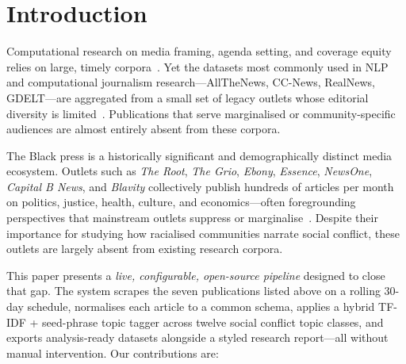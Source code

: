 \documentclass[sigconf,anonymous,review]{acmart}
\begin{document}


\maketitle

\section{Introduction}

Computational research on media framing, agenda setting, and coverage equity
relies on large, timely corpora~\cite{card2015media,hamilton2004news}.
Yet the datasets most commonly used in NLP and computational journalism
research—AllTheNews, CC-News, RealNews, GDELT—are aggregated from a small set
of legacy outlets whose editorial diversity is limited~\cite{gruppi2020nelagt}.
Publications that serve marginalised or community-specific audiences are almost
entirely absent from these corpora.

The Black press is a historically significant and demographically distinct media
ecosystem.
Outlets such as \emph{The Root}, \emph{The Grio}, \emph{Ebony}, \emph{Essence},
\emph{NewsOne}, \emph{Capital B News}, and \emph{Blavity} collectively publish
hundreds of articles per month on politics, justice, health, culture, and
economics—often foregrounding perspectives that mainstream outlets suppress or
marginalise~\cite{pride1997blackpress,squires2000blackradio}.
Despite their importance for studying how racialised communities narrate social
conflict, these outlets are largely absent from existing research corpora.

This paper presents a \emph{live, configurable, open-source pipeline} designed
to close that gap.
The system scrapes the seven publications listed above on a rolling 30-day
schedule, normalises each article to a common schema, applies a hybrid
TF-IDF + seed-phrase topic tagger across twelve social conflict topic classes,
and exports analysis-ready datasets alongside a styled research report—all
without manual intervention.
Our contributions are:
\end{document}
